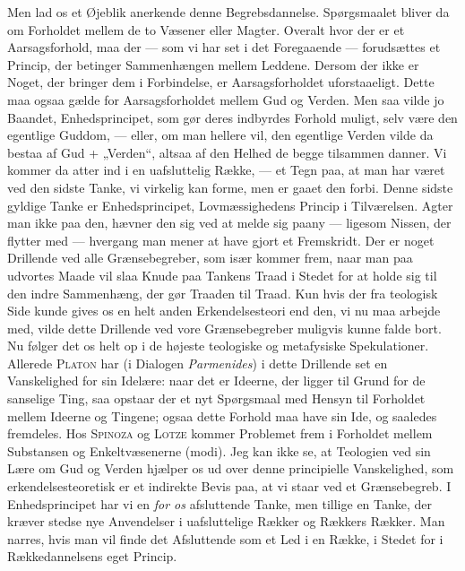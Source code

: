 \documentclass[12pt,a4paper,openany]{book}
\newcommand{\opage}[1]{\marginnote{\footnotesize\textit{[#1]}}}
\begin{document}
Men lad os et Øjeblik anerkende denne Begrebsdannelse. Spørgsmaalet
bliver da om Forholdet mellem de to Væsener eller Magter. Overalt hvor
der er et Aarsagsforhold, maa der --- som vi har set i det Foregaaende
--- forudsættes et Princip, der betinger Sammenhængen mellem Leddene.
Dersom der ikke er Noget, der bringer dem i Forbindelse, er
Aarsagsforholdet uforstaaeligt. Dette maa ogsaa gælde for
Aarsagsforholdet mellem Gud og Verden. Men saa vilde jo Baandet,
Enhedsprincipet, som gør deres indbyrdes Forhold muligt, selv være den
egentlige Guddom, --- eller, om man hellere vil, den egentlige Verden
vilde da bestaa af Gud + „Verden“, altsaa af den Helhed de begge
tilsammen danner. Vi kommer da atter ind i en uafsluttelig Række, --- et
Tegn paa, at man har været ved den sidste Tanke, vi virkelig kan forme,
men er gaaet den forbi. Denne sidste gyldige Tanke er Enhedsprincipet,
Lovmæssighedens Princip i Tilværelsen. Agter man ikke paa den, hævner
den sig ved at melde sig paany --- ligesom Nissen, der flytter med ---
hvergang man mener at have gjort et Fremskridt. Der er noget Drillende
ved alle Grænsebegreber, som især kommer frem, naar man paa udvortes
Maade vil slaa Knude paa Tankens Traad i Stedet for at holde sig til den
indre Sammenhæng, der gør Traaden til Traad. Kun hvis der fra teologisk
Side kunde gives os en helt anden Erkendelsesteori end den, vi nu maa
arbejde med, vilde dette Drillende ved vore Grænsebegreber muligvis
kunne falde bort. Nu følger det os helt op i de højeste teologiske og
metafysiske Spekulationer. Allerede \textsc{Platon} har (i Dialogen
\textit{Parmenides}) i dette Drillende set en Vanskelighed for sin
Idelære: naar det er Ideerne, der ligger til Grund for de sanselige
Ting, saa opstaar der et nyt Spørgsmaal med Hensyn til Forholdet mellem
Ideerne og Tingene; ogsaa dette Forhold maa have sin Ide, og saaledes
fremdeles. Hos \textsc{Spinoza} og \textsc{Lotze} kommer Problemet frem
i Forholdet mellem Substansen og Enkeltvæsenerne (modi). Jeg kan ikke
se, at Teologien ved sin Lære om Gud og Verden hjælper os ud over denne
principielle Vanskelighed, som erkendelsesteoretisk er et indirekte
Bevis paa, at vi staar ved et Grænsebegreb. I Enhedsprincipet har vi en
\textit{for os} afsluttende Tanke, men tillige en Tanke, der kræver
stedse nye Anvendelser i uafsluttelige Rækker og Rækkers Rækker. Man
narres, hvis man
\opage{38}vil finde det Afsluttende som et Led i en Række, i Stedet for
i Rækkedannelsens eget Princip.
\end{document}
